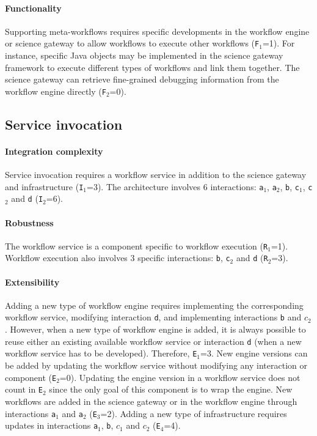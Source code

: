 \documentclass[preprint,3p,twocolumn]{elsarticle}
\newcommand{\correction}[1]{\color{blue}#1\color{black}\xspace}
\begin{document}
\paragraph{\correction{Functionality}} Supporting meta-workflows requires
specific developments in the workflow engine or science gateway to
allow workflows to execute other workflows (\texttt{\correction{F}$_1$}=1). For
instance, specific Java objects may be implemented in the science
gateway framework to execute different types of workflows and link
them together.  The science gateway can
retrieve fine-grained debugging information from the workflow engine
directly (\texttt{\correction{F}$_2$}=0).

\subsection{Service invocation}

\paragraph{Integration complexity} Service invocation requires a workflow service
in addition to the science gateway and infrastructure
(\texttt{I$_1$}=3). The architecture involves 6 interactions:
\texttt{a$_1$}, \texttt{a$_2$}, \texttt{b}, \texttt{c$_1$},
\texttt{c$_2$} and \texttt{d} (\texttt{I$_2$}=6).

\paragraph{Robustness} The workflow service is a component specific to
workflow execution (\texttt{R$_1$}=1). Workflow execution also
involves 3 specific interactions: \texttt{b},
\texttt{c$_2$} and \texttt{d} (\texttt{R$_2$}=3).

\paragraph{Extensibility} Adding a new type of workflow engine
requires implementing the corresponding workflow service,  modifying
interaction \texttt{d}, and  implementing interactions \texttt{b} and
\texttt{$c_2$}. \correction{However, when a new type of workflow engine is added, it is always possible to reuse either an existing available workflow service or interaction \texttt{d} (when a new workflow service has to be developed). Therefore, \texttt{E$_1$}=3}. New engine versions can be added by
updating the workflow service without modifying any interaction or
component (\texttt{E$_2$}=0). Updating the engine version in a
workflow service does not count in \texttt{E$_2$} since the only goal of this component
is to wrap the engine.  New workflows are added in the science gateway
or in the workflow engine through interactions \texttt{a$_1$} and
\texttt{a$_2$} (\texttt{E$_3$}=2). Adding a new type of infrastructure
requires updates in interactions \texttt{a$_1$}, \texttt{b},
\texttt{$c_1$} and \texttt{$c_2$} (\texttt{E$_4$}=4).
\end{document}
